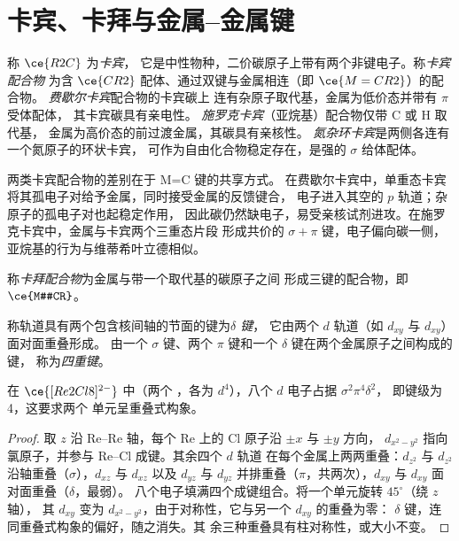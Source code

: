 \section{卡宾、卡拜与金属–金属键}

\begin{definition}[卡宾与卡宾配合物]\label{def:b3:organometallic-bonding:carbene}
称 $\ce{R2C}$ 为\emph{卡宾}，
它是中性物种，二价碳原子上带有两个非键电子。称\emph{卡宾配合物}
为含 $\ce{CR2}$ 配体、通过双键与金属相连（即 $\ce{M=CR2}$）的配合物。
\emph{费歇尔卡宾}配合物的卡宾碳上
连有杂原子取代基，金属为低价态并带有 $\pi$ 受体配体，
其卡宾碳具有亲电性。
\emph{施罗克卡宾}（亚烷基）配合物仅带 C 或 H 取代基，
金属为高价态的前过渡金属，其碳具有亲核性。
\emph{氮杂环卡宾}是两侧各连有一个氮原子的环状卡宾，
可作为自由化合物稳定存在，是强的 $\sigma$ 给体配体。
\end{definition}

两类卡宾配合物的差别在于 M=C 键的共享方式。
在费歇尔卡宾中，单重态卡宾将其孤电子对给予金属，同时接受金属的反馈键合，
电子进入其空的 $p$ 轨道；杂原子的孤电子对也起稳定作用，
因此碳仍然缺电子，易受亲核试剂进攻。在施罗克卡宾中，金属与卡宾两个三重态片段
形成共价的 $\sigma +
\pi$ 键，电子偏向碳一侧，亚烷基的行为与维蒂希叶立德相似。

\begin{definition}[卡拜配合物]\label{def:b3:organometallic-bonding:carbyne}
称\emph{卡拜配合物}为金属与带一个取代基的碳原子之间
形成三键的配合物，即 $\ce{M#CR}$。
\end{definition}

\begin{definition}\label{def:b3:organometallic-bonding:delta}
称轨道具有两个包含核间轴的节面的键为\emph{$\delta$ 键}，
它由两个 $d$ 轨道（如 $d_{xy}$ 与 $d_{xy}$）面对面重叠形成。
由一个 $\sigma$ 键、两个 $\pi$ 键和一个 $\delta$ 键在两个金属原子之间构成的键，
称为\emph{四重键}。
\end{definition}

\begin{proposition}[{$[\mathrm{Re_2Cl_8}]^{2-}$ 的四重键}]\label{prop:b3:organometallic-bonding:quadruple}
在 $\ce{[Re2Cl8]^{2-}}$ 中（两个 ，各为 $d^4$），八个 $d$ 电子占据 $\sigma^2\pi^4\delta^2$，
即键级为 4，这要求两个  单元呈重叠式构象。
\end{proposition}

\begin{proof}
取 $z$ 沿 Re--Re 轴，每个 Re 上的 Cl 原子沿 $\pm x$ 与 $\pm y$ 方向，
$d_{x^2-y^2}$ 指向氯原子，并参与 Re--Cl 成键。其余四个 $d$ 轨道
在每个金属上两两重叠：$d_{z^2}$ 与 $d_{z^2}$ 沿轴重叠（$\sigma$），$d_{xz}$ 与 $d_{xz}$ 以及
$d_{yz}$ 与 $d_{yz}$ 并排重叠（$\pi$，共两次），$d_{xy}$ 与 $d_{xy}$ 面对面重叠（$\delta$，最弱）。
八个电子填满四个成键组合。将一个单元旋转 $45^\circ$（绕 $z$ 轴），
其 $d_{xy}$ 变为 $d_{x^2-y^2}$，由于对称性，它与另一个 $d_{xy}$ 的重叠为零：
$\delta$ 键，连同重叠式构象的偏好，随之消失。其
余三种重叠具有柱对称性，或大小不变。
\end{proof}

